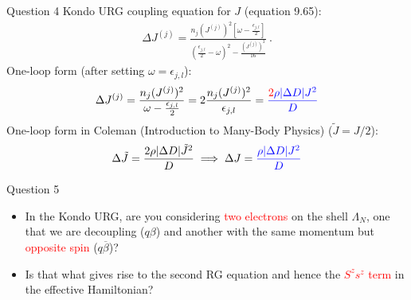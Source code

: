 \documentclass[12pt,aspectratio=169]{beamer}
\begin{document}
\begin{frame}{Question 4}
Kondo URG coupling equation for \(J\) (equation 9.65):
\begin{equation*}
\begin{aligned}
\Delta J^{(j)}=\frac{n_{j}(J^{(j)})^{2}\left[\omega- \frac{\epsilon_{j,l}}{2}\right]}{(\frac{\epsilon_{j,l}}{2}-\omega)^{2}-\frac{\left(J^{(j)}\right)^{2}}{16}}~.
\end{aligned}
\end{equation*}
One-loop form (after setting \(\omega = \epsilon_{j,l}\)):
\begin{equation*}
\begin{aligned}
	\Delta J^{(j)}= \frac{n_{j}(J^{(j)})^{2}}{\omega-\frac{\epsilon_{j,l}}{2}} = 2\frac{n_{j}(J^{(j)})^{2}}{\epsilon_{j,l}} = \textcolor{blue}{\frac{\textcolor{red}{2} \rho |\Delta D| J^2}{D}}
\end{aligned}
\end{equation*}
One-loop form in Coleman (Introduction to Many-Body Physics) (\(\tilde J = J/2\)):
\begin{equation*}
\begin{aligned}
	\Delta \tilde J = \frac{2 \rho |\Delta D| \tilde J^2}{D} \implies \Delta J = \textcolor{blue}{\frac{\rho |\Delta D| J^2}{D}}
\end{aligned}
\end{equation*}
\end{frame}

\begin{frame}{Question 5}
	\begin{itemize}
		\item In the Kondo URG, are you considering \textcolor{red}{two electrons} on the shell \(\Lambda_N\), one that we are decoupling (\(q\beta\)) and another with the same momentum but \textcolor{red}{opposite spin} (\(q\overline\beta\))? 
			\vspace{30pt}
		\item Is that what gives rise to the second RG equation and hence the \textcolor{red}{\(S^z s^z\) term} in the effective Hamiltonian?
	\end{itemize}
\end{frame}
\end{document}
